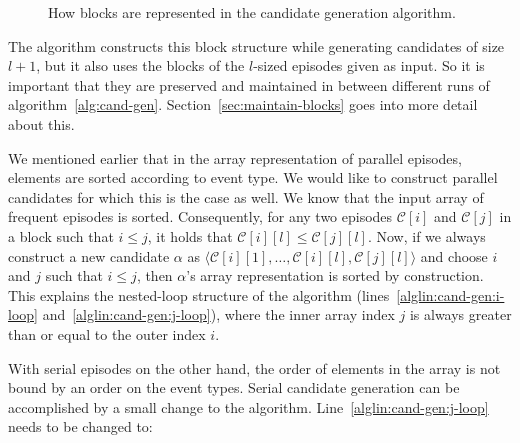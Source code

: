 \begin{figure}
\centering


\caption{How blocks are represented in the candidate generation algorithm.}
\label{fig:block-values}
\end{figure}

The algorithm constructs this block structure while generating candidates of size $ l + 1 $, but it also uses the blocks of the $ l $-sized episodes given as input. So it is important that they are preserved and maintained in between different runs of algorithm~\ref{alg:cand-gen}. Section~\ref{sec:maintain-blocks} goes into more detail about this.

We mentioned earlier that in the array representation of parallel episodes, elements are sorted according to event type. We would like to construct parallel candidates for which this is the case as well. We know that the input array of frequent episodes is sorted. Consequently, for any two episodes $ \mathcal{C}[i] $ and $ \mathcal{C}[j] $ in a block such that $ i \leq j $, it holds that $ \mathcal{C}[i][l] \leq \mathcal{C}[j][l] $.
Now, if we always construct a new candidate $ \alpha $ as $ \langle \mathcal{C}[i][1], \ldots,\allowbreak\mathcal{C}[i][l],\allowbreak\mathcal{C}[j][l] \rangle $ and choose $ i $ and $ j $ such that $ i \leq j $, then $ \alpha $'s array representation is sorted by construction. This explains the nested-loop structure of the algorithm (lines~\ref{alglin:cand-gen:i-loop} and~\ref{alglin:cand-gen:j-loop}), where the inner array index $ j $ is always greater than or equal to the outer index $ i $.

With serial episodes on the other hand, the order of elements in the array is not bound by an order on the event types.
Serial candidate generation can be accomplished by a small change to the algorithm. Line~\ref{alglin:cand-gen:j-loop} needs to be changed to:

